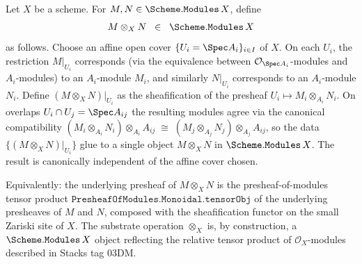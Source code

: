 \begin{definition}\leanok
  \label{def:scheme_modules_tensorobj}
  Let \(X\) be a scheme. For
  \(M, N \in \Scheme.\mathtt{Modules}\,X\), define
  \[
    M \otimes_X N \;\;\in\;\; \Scheme.\mathtt{Modules}\,X
  \]
  as follows. Choose an affine open cover \(\{U_i = \Spec A_i\}_{i \in I}\)
  of \(X\). On each \(U_i\), the restriction
  \(M|_{U_i}\) corresponds (via the equivalence between
  \(\mathcal{O}_{\Spec A_i}\)-modules and \(A_i\)-modules) to an
  \(A_i\)-module \(M_i\), and similarly
  \(N|_{U_i}\) corresponds to an \(A_i\)-module \(N_i\). Define
  \((M \otimes_X N)|_{U_i}\) as the sheafification of the presheaf
  \(U_i \mapsto M_i \otimes_{A_i} N_i\). On overlaps
  \(U_i \cap U_j = \Spec A_{ij}\) the resulting modules agree via the
  canonical compatibility
  \((M_i \otimes_{A_i} N_i) \otimes_{A_i} A_{ij}
     \;\cong\;
     (M_j \otimes_{A_j} N_j) \otimes_{A_j} A_{ij}\),
  so the data \(\{(M \otimes_X N)|_{U_i}\}\) glue to a single object
  \(M \otimes_X N\) in \(\Scheme.\mathtt{Modules}\,X\). The result is
  canonically independent of the affine cover chosen.

  Equivalently: the underlying presheaf of \(M \otimes_X N\) is the
  presheaf-of-modules tensor product
  \(\mathtt{PresheafOfModules.Monoidal.tensorObj}\) of the underlying
  presheaves of \(M\) and \(N\), composed with the sheafification
  functor on the small Zariski site of \(X\). The substrate operation
  \(\otimes_X\) is, by construction, a \(\Scheme.\mathtt{Modules}\,X\)
  object reflecting the relative tensor product of
  \(\mathcal{O}_X\)-modules described in Stacks tag 03DM.
\end{definition}

